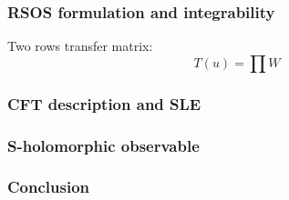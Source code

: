 \documentclass[pdftex]{beamer}
\theoremstyle{definition} \newtheorem{Def}{Definition}
\begin{document}
   \begin{frame}
     \frametitle{RSOS formulation and integrability}
     Two rows transfer matrix:
     \begin{equation}
       \label{eq:5}
       T(u)=\prod W
     \end{equation}
   \end{frame}
  \begin{frame}
    \frametitle{ CFT description and SLE }
  \end{frame}
  \begin{frame}
    \frametitle{ S-holomorphic observable}
  \end{frame}
  \begin{frame}
    \frametitle{ Conclusion}
  \end{frame}
{} 
  
\end{document}
